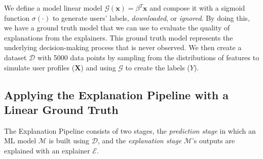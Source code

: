 \documentclass[mnsc,blindrev]{informs3}
\newcommand{\bx}{\mathbf{x}}
\begin{document}
   We define a model linear model $\mathcal{G}(\bx)=\beta^T\bx$ and compose it with a sigmoid function $\sigma(\cdot)$ to generate users' labels, \textit{downloaded}, or \textit{ignored}. By doing this, we have a ground truth model that we can use to evaluate the quality of explanations from the explainers. This ground truth model represents the underlying decision-making process that is never observed.  %
   We then create a dataset $\mathcal{D}$ with 5000 data points by sampling from the distributions of features to simulate user profiles ($\mathbf{X}$) and using $\mathcal{G}$ to create the labels ($Y$).  


\subsection{Applying the Explanation Pipeline with a Linear Ground Truth}
\label{sec:applying_to_simulated}
The Explanation Pipeline consists of two stages, the \emph{prediction stage} in which an ML model $\mathcal{M}$ is built using $\mathcal{D}$, and the \emph{explanation stage} $\mathcal{M}$'s outputs are explained with an explainer $\mathcal{E}$. 
\end{document}
